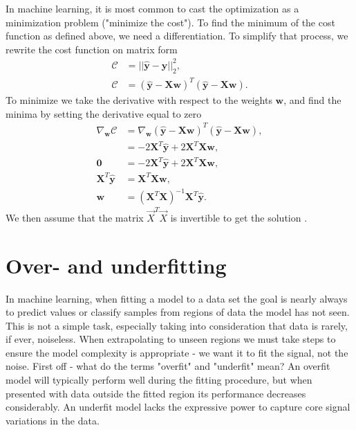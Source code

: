 In machine learning, it is most common to cast the optimization as a minimization problem
("minimize the cost"). To find the minimum of the cost function as defined above, we need
a differentiation. To simplify that process, we rewrite the cost function on matrix form
\begin{align*}
\mathcal{C} &= || \boldsymbol{\hat{y}} - \boldsymbol{y} ||_2 ^2, \\
\mathcal{C} &= ( \boldsymbol{\hat{y}} - \boldsymbol{Xw})^T( \boldsymbol{\hat{y}} - \boldsymbol{Xw}).
\end{align*}
To minimize we take the derivative with respect to the weights $\boldsymbol{w}$,
and find the minima by setting the derivative equal to zero
\begin{align}
\nabla _{\boldsymbol{w}}\mathcal{C} &= \nabla _{\boldsymbol{w}} ( \boldsymbol{\hat{y}} - \boldsymbol{Xw})^T( \boldsymbol{\hat{y}} - \boldsymbol{Xw}), \\
&= -2\boldsymbol{X}^T\boldsymbol{\hat{y}} + 2\boldsymbol{X}^T\boldsymbol{X}\boldsymbol{w}, \\
\boldsymbol{0} &= -2\boldsymbol{X}^T\boldsymbol{\hat{y}} + 2\boldsymbol{X}^T\boldsymbol{X}\boldsymbol{w}, \\
\boldsymbol{X}^T\boldsymbol{\hat{y}} &= \boldsymbol{X}^T\boldsymbol{X}\boldsymbol{w}, \\
\boldsymbol{w} &=(\boldsymbol{X}^T\boldsymbol{X})^{-1} \boldsymbol{X}^T\boldsymbol{\hat{y}}. \label{eq:ols}
\end{align}
We then assume that the matrix \(\vec{X}^T\vec{X}\)
is invertible to get the solution \cite{James2000}.

\section{Over- and underfitting}\label{sec:overfitting}
In machine learning, when fitting a model to a data set the goal is nearly always to predict 
values or classify samples from regions of data the model has not seen. This is not a simple task,
especially taking into consideration that data is rarely, if ever, noiseless. When extrapolating to 
unseen regions we must take steps to ensure the model complexity is appropriate - we want it to fit 
the signal, not the noise. First off - what do the terms "overfit" and "underfit" mean?
An overfit model will typically perform well during the fitting procedure, but when presented with
data outside the fitted region its performance decreases considerably.
An underfit model lacks the expressive power to capture core signal variations in the data.



